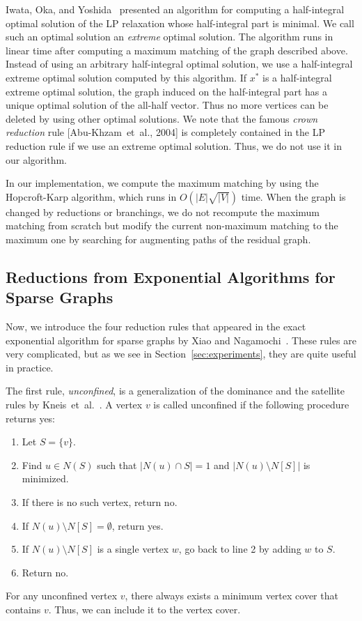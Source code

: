\documentclass[11pt]{article}
\begin{document}
Iwata, Oka, and Yoshida~\cite{bip2/iwata14} presented an algorithm for computing a half-integral
optimal solution of the LP relaxation whose half-integral part is minimal.
We call such an optimal solution an \emph{extreme} optimal solution.
The algorithm runs in linear time after computing a maximum matching of the graph described above.
Instead of using an arbitrary half-integral optimal solution, we use a half-integral extreme optimal solution
computed by this algorithm.
If $x^*$ is a half-integral extreme optimal solution, the graph induced on the half-integral part has a unique optimal
solution of the all-half vector.
Thus no more vertices can be deleted by using other optimal solutions.
We note that the famous \emph{crown reduction} rule [Abu-Khzam~et~al., 2004] is
completely contained in the LP reduction rule if we use an extreme optimal solution.
Thus, we do not use it in our algorithm.

In our implementation, we compute the maximum matching by using the Hopcroft-Karp algorithm, which runs in
$O(|E|\sqrt{|V|})$ time.
When the graph is changed by reductions or branchings, we do not recompute the maximum matching from scratch but
modify the current non-maximum matching to the maximum one by searching for augmenting paths of the residual graph.



\subsection{Reductions from Exponential Algorithms for Sparse Graphs}\label{sec:reduction:sparse}
Now, we introduce the four reduction rules that appeared in the exact exponential algorithm for sparse graphs by
Xiao and Nagamochi~\cite{vc_reduction/nagamochi2013}.
These rules are very complicated, but as we see in Section~\ref{sec:experiments}, they are quite
useful in practice.

The first rule, \emph{unconfined}, is a generalization of the dominance
and the satellite rules by Kneis~et~al.~\cite{DBLP:conf/fsttcs/KneisLR09}.
A vertex $v$ is called unconfined if the following procedure returns yes:
\begin{enumerate}
  \item Let $S=\{v\}$.
  \item Find $u\in N(S)$ such that $|N(u)\cap S|=1$ and $|N(u)\setminus N[S]|$ is minimized.
  \item If there is no such vertex, return no.
  \item If $N(u)\setminus N[S]=\emptyset$, return yes.
  \item If $N(u)\setminus N[S]$ is a single vertex $w$, go back to line 2 by
  adding $w$ to $S$.
  \item Return no.
\end{enumerate}
For any unconfined vertex $v$, there always exists a minimum vertex cover that contains $v$.
Thus, we can include it to the vertex cover.
\end{document}
